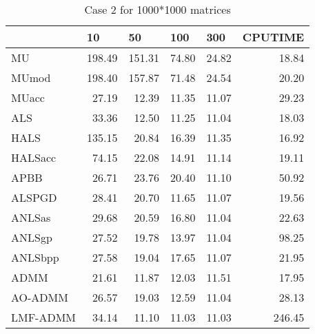 \documentclass{article}
\begin{document}
\begin{table}[H]
		\caption{Case 2 for 1000*1000 matrices}
	\centering
	\begin{tabular}{|l|r|r|r|r|r|}
		\hline
		& \multicolumn{1}{l|}{10} & \multicolumn{1}{l|}{50} & \multicolumn{1}{l|}{100} & \multicolumn{1}{l|}{300} & \multicolumn{1}{l|}{CPUTIME} \\ \hline
		MU       & 198.49                  & 151.31                  & 74.80                    & 24.82                    & 18.84                        \\ \hline
		MUmod    & 198.40                  & 157.87                  & 71.48                    & 24.54                    & 20.20                        \\ \hline
		MUacc    & 27.19                   & 12.39                   & 11.35                    & 11.07                    & 29.23                        \\ \hline
		ALS      & 33.36                   & 12.50                   & 11.25                    & 11.04                    & 18.03                        \\ \hline
		HALS     & 135.15                  & 20.84                   & 16.39                    & 11.35                    & 16.92                        \\ \hline
		HALSacc  & 74.15                   & 22.08                   & 14.91                    & 11.14                    & 19.11                        \\ \hline
		APBB     & 26.71                   & 23.76                   & 20.40                    & 11.10                    & 50.92                        \\ \hline
		ALSPGD   & 28.41                   & 20.70                   & 11.65                    & 11.07                    & 19.56                        \\ \hline
		ANLSas   & 29.68                   & 20.59                   & 16.80                    & 11.04                    & 22.63                        \\ \hline
		ANLSgp   & 27.52                   & 19.78                   & 13.97                    & 11.04                    & 98.25                        \\ \hline
		ANLSbpp  & 27.58                   & 19.04                   & 17.65                    & 11.07                    & 21.95                        \\ \hline
		ADMM     & 21.61                   & 11.87                   & 12.03                    & 11.51                    & 17.95                        \\ \hline
		AO-ADMM  & 26.57                   & 19.03                   & 12.59                    & 11.04                    & 28.13                        \\ \hline
		LMF-ADMM & 34.14                   & 11.10                   & 11.03                    & 11.03                    & 246.45                       \\ \hline
	\end{tabular}
\end{table}
\end{document}

